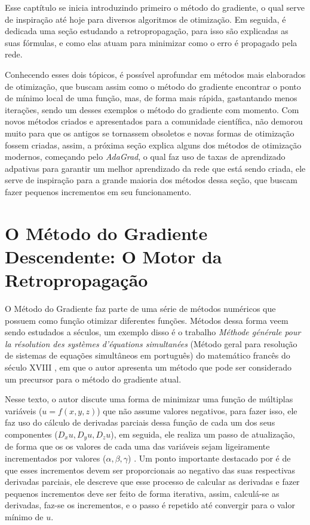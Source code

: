 Esse captítulo se inicia introduzindo primeiro o método do gradiente, o qual serve de inspiração até hoje para diversos algoritmos de otimização. Em seguida, é dedicada uma seção estudando a retropropagação, para isso são explicadas as suas fórmulas, e como elas atuam para minimizar como o erro é propagado pela rede. 

Conhecendo esses dois tópicos, é possível aprofundar em métodos mais elaborados de otimização, que buscam assim como o método do gradiente encontrar o ponto de mínimo local de uma função, mas, de forma mais rápida, gastantando menos iterações, sendo um desses exemplos o método do gradiente com momento. Com novos métodos criados e apresentados para a comunidade científica, não demorou muito para que os antigos se tornassem obsoletos e novas formas de otimização fossem criadas, assim, a próxima seção explica alguns dos métodos de otimização modernos, começando pelo \textit{AdaGrad}, o qual faz uso de taxas de aprendizado adpativas para garantir um melhor aprendizado da rede que está sendo criada, ele serve de inspiração para a grande maioria dos métodos dessa seção, que buscam fazer pequenos incrementos em seu funcionamento.


\section{O Método do Gradiente Descendente: O Motor da Retropropagação} 

O Método do Gradiente faz parte de uma série de métodos numéricos que possuem como função otimizar diferentes funções. Métodos dessa forma veem sendo estudados a séculos, um exemplo disso é o trabalho \textit{M{\'e}thode g{\'e}n{\'e}rale pour la r{\'e}solution des syst{\`e}mes d'{\'e}quations simultan{\'e}es} (Método geral para resolução de sistemas de equações simultâneos em português) do matemático francês do século XVIII \textcite{CauchyMetodoDoGradiente}, em que o autor apresenta um método que pode ser considerado um precursor para o método do gradiente atual.

Nesse texto, o autor discute uma forma de minimizar uma função de múltiplas variáveis ($u=f(x,y,z)$) que não assume valores negativos, para fazer isso, ele faz uso do cálculo de derivadas parciais dessa função de cada um dos seus componentes ($D_x u, D_y u, D_z u$), em seguida, ele realiza um passo de atualização, de forma que os os valores de cada uma das variáveis sejam ligeiramente incrementados por valores ($\alpha, \beta, \gamma$) \parencite{CauchyMetodoDoGradiente}. Um ponto importante destacado por \textcite{CauchyMetodoDoGradiente} é de que esses incrementos devem ser proporcionais ao negativo das suas respectivas derivadas parciais, ele descreve que esse processo de calcular as derivadas e fazer pequenos incrementos deve ser feito de forma iterativa, assim, calculá-se as derivadas, faz-se os incrementos, e o passo é repetido até convergir para o valor mínimo de $u$.

